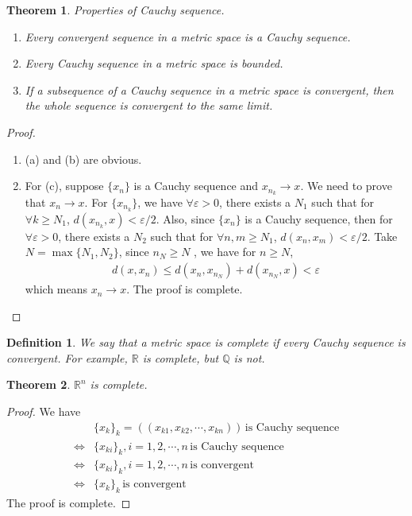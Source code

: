 \documentclass[12pt,leqno]{amsart}
\newtheorem{definition}{Definition}[section]
\newtheorem{theorem}{Theorem}[section]
\theoremstyle{definition}
\numberwithin{equation}{subsection}
\begin{document}
\begin{theorem}
Properties of Cauchy sequence.
\begin{enumerate}
    \item Every convergent sequence in a metric space is a Cauchy sequence.
    \item Every Cauchy sequence in a metric space is bounded.
    \item If a subsequence of a Cauchy sequence in a metric space is convergent, then the whole sequence is convergent to the same limit.
\end{enumerate}
\end{theorem}
\begin{proof}
~\begin{enumerate}
    \item (a) and (b) are obvious.
    \item For (c), suppose $\{x_n\}$ is a Cauchy sequence and $x_{n_k}\to x$. We need to prove that $x_n\to x$. For $\{x_{n_k}\}$, we have $\forall \varepsilon > 0$, there exists a $N_1$ such that for $\forall k \geq N_1$, $d(x_{n_k},x)<\varepsilon/2$. Also, since $\{x_n\}$ is a Cauchy sequence, then for $\forall \varepsilon > 0$, there exists a $N_2$ such that for $\forall n,m \geq N_1$, $d(x_n,x_m)<\varepsilon/2$. Take $N = \max\{N_1, N_2\}$, since $n_N \geq N$ , we have for $n \geq N$,
    \begin{align*}
        d(x,x_n) \leq d(x_n, x_{n_N}) + d(x_{n_N}, x) < \varepsilon
    \end{align*}
    which means $x_n\to x$. The proof is complete.
\end{enumerate}
\end{proof}

\medskip

\begin{definition}
We say that a metric space is complete if every Cauchy sequence is convergent. For example, $\mathbb{R}$ is complete, but $\mathbb{Q}$ is not.
\end{definition}

\medskip

\begin{theorem}
$\mathbb{R}^n$ is complete.
\end{theorem}
\begin{proof}
We have 
\begin{align*}
    & \{x_k\}_k = ((x_{k1},x_{k2},\cdots, x_{kn}))\,\text{is Cauchy sequence} \\
    \Leftrightarrow & \{x_{ki}\}_k, i = 1,2,\cdots, n \,\text{is Cauchy sequence} \\
    \Leftrightarrow & \{x_{ki}\}_k, i = 1,2,\cdots, n \,\text{is convergent} \\
    \Leftrightarrow & \{x_k\}_k\,\text{is convergent}
\end{align*}
The proof is complete.
\end{proof}
\end{document}
